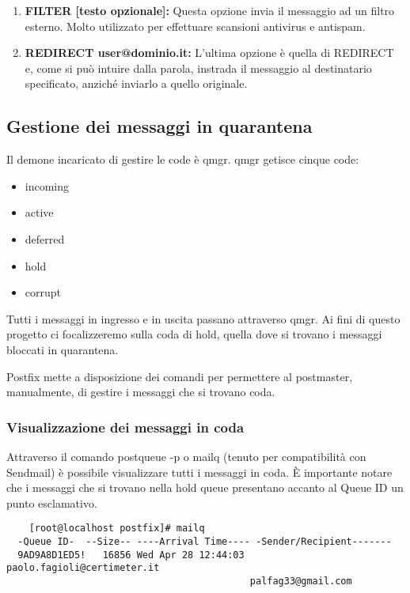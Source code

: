 \begin{table}[htp]
\begin{enumerate}[label=\textbf{\arabic*})]
      \item{\textbf{FILTER [testo opzionale]:}}
      Questa opzione invia il messaggio ad un filtro esterno. Molto utilizzato per effettuare scansioni 
      antivirus e antispam.
      
      \item{\textbf{REDIRECT user@dominio.it:}} 
      L'ultima opzione è quella di REDIRECT e, come si può intuire dalla parola, instrada il messaggio al 
      destinatario specificato, anziché inviarlo a quello originale.
  \end{enumerate}
  \end{table}
  
  \pagebreak
  \begin{table}[htp]
    \subsection{Gestione dei messaggi in quarantena}
    Il demone incaricato di gestire le code è qmgr. qmgr getisce cinque code:
    \begin{itemize}
      \item incoming
      \item active
      \item deferred
      \item hold
      \item corrupt
    \end{itemize}
  \end{table}
  
  Tutti i messaggi in ingresso e in uscita passano attraverso qmgr. Ai fini di questo progetto ci focalizzeremo
  sulla coda di hold, quella dove si trovano i messaggi bloccati in quarantena.
  
  Postfix mette a disposizione dei comandi per permettere al postmaster, manualmente, di gestire i messaggi che si 
  trovano coda.
  
  \subsubsection{Visualizzazione dei messaggi in coda}
  Attraverso il comando postqueue -p o mailq (tenuto per compatibilità con Sendmail) è possibile visualizzare tutti
  i messaggi in coda. È importante notare che i messaggi che si trovano nella hold queue presentano accanto al Queue ID 
  un punto esclamativo.
  
  \begin{verbatim}
    [root@localhost postfix]# mailq
  -Queue ID-  --Size-- ----Arrival Time---- -Sender/Recipient-------
  9AD9A8D1ED5!   16856 Wed Apr 28 12:44:03  paolo.fagioli@certimeter.it
                                           palfag33@gmail.com
  \end{verbatim}
  
